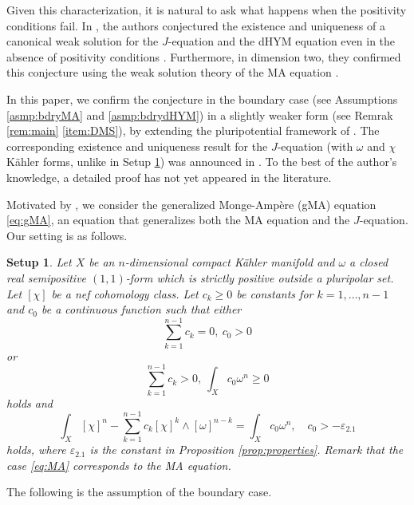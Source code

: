 \documentclass[10pt,a4paper]{amsart}
\numberwithin{equation}{section}
\newtheorem{setup}[equation]{Setup}
\begin{document}
Given this characterization, it is natural to ask what happens when the positivity conditions fail. In \cite{DMS}, the authors conjectured the existence and uniqueness of a canonical weak solution for the $J$-equation and the dHYM equation even in the absence of positivity conditions \cite[Conjectures 1.5 and 1.12]{DMS}. Furthermore, in dimension two, they confirmed this conjecture using the weak solution theory of the MA equation \cite{BEGZ}.

In this paper, we confirm the conjecture in the boundary case (see Assumptions \ref{asmp:bdryMA} and \ref{asmp:bdrydHYM}) in a slightly weaker form (see Remrak \ref{rem:main} \ref{item:DMS}), by extending the pluripotential framework of \cite{BEGZ}. 
The corresponding existence and uniqueness result for the $J$-equation
(with $\omega$ and $\chi$ Kähler forms, unlike in Setup \ref{setup})
was announced in \cite{DMS}.
To the best of the author's knowledge, a detailed proof has not yet appeared in the literature.

Motivated by \cite{Datar-Pingali,FM}, we consider the generalized Monge-Ampère (gMA) equation \eqref{eq:gMA}, an equation that generalizes both the MA equation and the $J$-equation. Our setting is as follows. 
\begin{setup}\label{setup}
    Let $X$ be an $n$-dimensional compact Kähler manifold and $\omega$ a closed real semipositive $(1,1)$-form which is strictly positive outside a pluripolar set. Let $[\chi]$ be a nef cohomology class. Let $c_k\ge0$ be constants for $k=1,\dots,n-1$ and $c_0$ be a continuous function such that either 
    \begin{equation}\label{eq:MA}
        \sum_{k=1}^{n-1} c_k=0,\ c_0>0
    \end{equation} or 
    \begin{equation}\label{eq:gMAtop}
        \sum_{k=1}^{n-1} c_k>0,\ \int_Xc_0\omega^n\ge0
    \end{equation} 
    holds and
    \begin{equation*}
        \int_X[\chi]^n-\sum_{k=1}^{n-1}c_k[\chi]^{k}\wedge[\omega]^{n-k}=\int_Xc_0\omega^n,\quad c_0>-\varepsilon_{2.1}
    \end{equation*}
    holds, where $\varepsilon_{2.1}$ is the constant in Proposition \ref{prop:properties}. 
    Remark that the case \eqref{eq:MA} corresponds to the MA equation.
\end{setup}

The following is the assumption of the boundary case.
\end{document}
